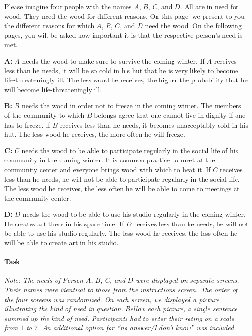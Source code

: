 \documentclass[10pt,letterpaper]{article}
\begin{document}
\noindent Please imagine four people with the names $A$, $B$, $C$, and $D$.
All are in need for wood.
They need the wood for different reasons.
On this page, we present to you the different reasons for which $A$, $B$, $C$, and $D$ need the wood.
On the following pages, you will be asked how important it is that the respective person's need is met.\vspace{2ex}

\noindent\textbf{A:} $A$ needs the wood to make sure to survive the coming winter.
If $A$ receives less than he needs, it will be so cold in his hut that he is very likely to become life-threateningly ill.
The less wood he receives, the higher the probability that he will become life-threateningly ill.\vspace{2ex}

\noindent\textbf{B:} $B$ needs the wood in order not to freeze in the coming winter.
The members of the community to which $B$ belongs agree that one cannot live in dignity if one has to freeze.
If $B$ receives less than he needs, it becomes unacceptably cold in his hut.
The less wood he receives, the more often he will freeze.\vspace{2ex}

\noindent\textbf{C:} $C$ needs the wood to be able to participate regularly in the social life of his community in the coming winter.
It is common practice to meet at the community center and everyone brings wood with which to heat it.
If $C$ receives less than he needs, he will not be able to participate regularly in the social life.
The less wood he receives, the less often he will be able to come to meetings at the community center.\vspace{2ex}

\noindent\textbf{D:} $D$ needs the wood to be able to use his studio regularly in the coming winter.
He creates art there in his spare time.
If $D$ receives less than he needs, he will not be able to use his studio regularly.
The less wood he receives, the less often he will be able to create art in his studio.\vspace{2ex}


\paragraph*{Task}
\noindent\textit{Note: The needs of Person $A$, $B$, $C$, and $D$ were displayed on separate screens.
Their names were identical to those from the instructions screen.
The order of the four screens was randomized.
On each screen, we displayed a picture illustrating the kind of need in question.
Bellow each picture, a single sentence summed up the kind of need.
Participants had to enter their rating on a scale from $1$ to $7$.
An additional option for ``no answer/I don't know'' was included.}\vspace{2ex}
\end{document}
